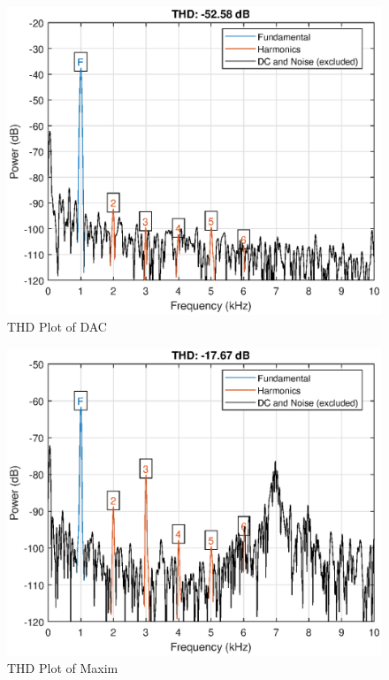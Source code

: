 \documentclass[main.tex]{subfiles}
\begin{document}
\begin{figure}[H]
    \centering
    \includegraphics[scale=0.75]{./figs/dacTHDPlot.eps}        
    \caption{THD Plot of DAC}
    \label{fig:ti-thd}
\end{figure}

\begin{figure}[H]
    \centering
    \includegraphics[scale=0.75]{./figs/maxiTHDPlot.eps}        
    \caption{THD Plot of Maxim}
    \label{fig:ti-thd}
\end{figure}
\end{document}
